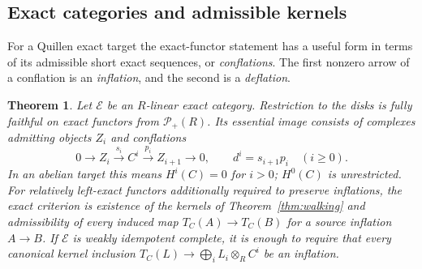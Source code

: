 \documentclass[11pt,a4paper]{article}
\newtheorem{theorem}{Theorem}[section]
\theoremstyle{definition}
\begin{document}
\subsection{Exact categories and admissible kernels}
For a Quillen exact target the exact-functor statement has a useful
form in terms of its admissible short exact sequences, or
\emph{conflations}. The first nonzero arrow of a conflation is an
\emph{inflation}, and the second is a \emph{deflation}.
\begin{theorem}\label{thm:exact}
Let $\mathcal E$ be an $R$-linear exact category. Restriction to the
disks is fully faithful on exact functors from $\mathcal P_+(R)$.
Its essential image consists of complexes admitting objects $Z_i$
and conflations
\[
 0\longrightarrow Z_i\xrightarrow{s_i}C^i
 \xrightarrow{p_i}Z_{i+1}\longrightarrow0,
 \qquad d^i=s_{i+1}p_i \quad(i\ge0).
\]
In an abelian target this means $H^i(C)=0$ for $i>0$; $H^0(C)$
is unrestricted. For relatively left-exact functors additionally
required to preserve inflations, the exact criterion is existence
of the kernels of Theorem~\ref{thm:walking} and admissibility of
every induced map $T_C(A)\to T_C(B)$ for a source inflation
$A\to B$. If $\mathcal E$ is weakly idempotent complete, it is
enough to require that every canonical kernel inclusion
$T_C(L)\to\bigoplus_i L_i\otimes_R C^i$ be an inflation.
\end{theorem}
\end{document}
